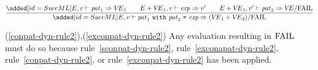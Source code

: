 \begin{equation}	%
\frac{\ADD{\E,\V\ts\pat_1\ra\VE_1 \qquad \plusmap{\E}{\VE_1},\V\ts\exp\ra\V'
      \qquad \plusmap{\E}{\VE_1},\V'\ts\pat_2\ra\VE/\fail}}
     {\ADD{\E,\V\ts\nestedpat\ra(\plusmap{\VE_1}{\VE_2})/\fail}}
\end{equation}

\EndNewEqns

%
%
\comments
\begin{description}
\item{(\ref{conpat-dyn-rule2}),(\ref{exconpat-dyn-rule2})}
  Any evaluation resulting in ${\rm FAIL}$ must do so because 
rule~\ref{sconpat-dyn-rule2},
rule~\ref{exconapat-dyn-rule2},
rule~\ref{conpat-dyn-rule2},
or rule~\ref{exconpat-dyn-rule2} has been
applied.
\end{description}

